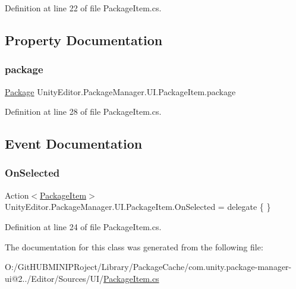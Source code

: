 Definition at line 22 of file Package\+Item.\+cs.



\subsection{Property Documentation}
\mbox{\label{class_unity_editor_1_1_package_manager_1_1_u_i_1_1_package_item_ae1fd38fe3b548b78ce8dd5b24d73d784}} 
\subsubsection{\texorpdfstring{package}{package}}
{\footnotesize\ttfamily \mbox{\hyperlink{class_unity_editor_1_1_package_manager_1_1_u_i_1_1_package}{Package}} Unity\+Editor.\+Package\+Manager.\+U\+I.\+Package\+Item.\+package\hspace{0.3cm}{\ttfamily [get]}}



Definition at line 28 of file Package\+Item.\+cs.



\subsection{Event Documentation}
\mbox{\label{class_unity_editor_1_1_package_manager_1_1_u_i_1_1_package_item_ada9c99405a7245f7d23fe5de001ac602}} 
\subsubsection{\texorpdfstring{OnSelected}{OnSelected}}
{\footnotesize\ttfamily Action$<$\mbox{\hyperlink{class_unity_editor_1_1_package_manager_1_1_u_i_1_1_package_item}{Package\+Item}}$>$ Unity\+Editor.\+Package\+Manager.\+U\+I.\+Package\+Item.\+On\+Selected = delegate \{ \}}



Definition at line 24 of file Package\+Item.\+cs.



The documentation for this class was generated from the following file\+:\begin{DoxyCompactItemize}
\item 
O\+:/\+Git\+H\+U\+B\+M\+I\+N\+I\+P\+Roject/\+Library/\+Package\+Cache/com.\+unity.\+package-\/manager-\/ui@2../\+Editor/\+Sources/\+U\+I/\mbox{\hyperlink{_package_item_8cs}{Package\+Item.\+cs}}\end{DoxyCompactItemize}
